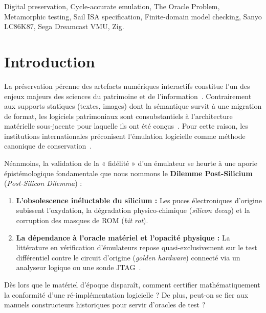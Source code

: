\documentclass[10pt,journal,compsoc]{IEEEtran}
\begin{document}
\begin{IEEEkeywords}
Digital preservation, Cycle-accurate emulation, The Oracle Problem, Metamorphic testing, Sail ISA specification, Finite-domain model checking, Sanyo LC86K87, Sega Dreamcast VMU, Zig.
\end{IEEEkeywords}


\section{Introduction}

La préservation pérenne des artefacts numériques interactifs constitue l'un des enjeux majeurs des sciences du patrimoine et de l'information~\cite{unesco2003, rothenberg1995}. Contrairement aux supports statiques (textes, images) dont la sémantique survit à une migration de format, les logiciels patrimoniaux sont consubstantiels à l'architecture matérielle sous-jacente pour laquelle ils ont été conçus~\cite{rothenberg1999}. Pour cette raison, les institutions internationales préconisent l'émulation logicielle comme méthode canonique de conservation~\cite{rosenthal2015, rechert2012}.

Néanmoins, la validation de la « fidélité » d'un émulateur se heurte à une aporie épistémologique fondamentale que nous nommons le \textbf{Dilemme Post-Silicium} (\textit{Post-Silicon Dilemma}) :
\begin{enumerate}
    \item \textbf{L'obsolescence inéluctable du silicium :} Les puces électroniques d'origine subissent l'oxydation, la dégradation physico-chimique (\textit{silicon decay}) et la corruption des masques de ROM (\textit{bit rot}).
    \item \textbf{La dépendance à l'oracle matériel et l'opacité physique :} La littérature en vérification d'émulateurs repose quasi-exclusivement sur le test différentiel contre le circuit d'origine (\textit{golden hardware}) connecté via un analyseur logique ou une sonde JTAG~\cite{martignoni2009, chen2021emufuzzer}.
\end{enumerate}

Dès lors que le matériel d'époque disparaît, comment certifier mathématiquement la conformité d'une ré-implémentation logicielle ? De plus, peut-on se fier aux manuels constructeurs historiques pour servir d'oracles de test ?
\end{document}
